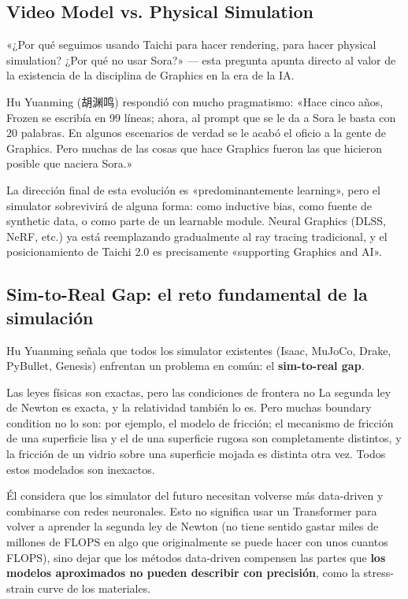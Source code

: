 \documentclass[a4paper]{article}
\begin{document}
\subsection{Video Model vs. Physical Simulation}

«¿Por qué seguimos usando Taichi para hacer rendering, para hacer physical simulation? ¿Por qué no usar Sora?» — esta pregunta apunta directo al valor de la existencia de la disciplina de Graphics en la era de la IA.

Hu Yuanming (胡渊鸣) respondió con mucho pragmatismo: «Hace cinco años, Frozen se escribía en 99 líneas; ahora, al prompt que se le da a Sora le basta con 20 palabras. En algunos escenarios de verdad se le acabó el oficio a la gente de Graphics. Pero muchas de las cosas que hace Graphics fueron las que hicieron posible que naciera Sora.»

La dirección final de esta evolución es «predominantemente learning», pero el simulator sobrevivirá de alguna forma: como inductive bias, como fuente de synthetic data, o como parte de un learnable module. Neural Graphics (DLSS, NeRF, etc.) ya está reemplazando gradualmente al ray tracing tradicional, y el posicionamiento de Taichi 2.0 es precisamente «supporting Graphics and AI».

\subsection{Sim-to-Real Gap: el reto fundamental de la simulación}

Hu Yuanming señala que todos los simulator existentes (Isaac, MuJoCo, Drake, PyBullet, Genesis) enfrentan un problema en común: el \textbf{sim-to-real gap}.

\begin{warningbox}{Las leyes físicas son exactas, pero las condiciones de frontera no}
La segunda ley de Newton es exacta, y la relatividad también lo es. Pero muchas boundary condition no lo son: por ejemplo, el modelo de fricción; el mecanismo de fricción de una superficie lisa y el de una superficie rugosa son completamente distintos, y la fricción de un vidrio sobre una superficie mojada es distinta otra vez. Todos estos modelados son inexactos.
\end{warningbox}

Él considera que los simulator del futuro necesitan volverse más data-driven y combinarse con redes neuronales. Esto no significa usar un Transformer para volver a aprender la segunda ley de Newton (no tiene sentido gastar miles de millones de FLOPS en algo que originalmente se puede hacer con unos cuantos FLOPS), sino dejar que los métodos data-driven compensen las partes que \textbf{los modelos aproximados no pueden describir con precisión}, como la stress-strain curve de los materiales.
\end{document}
